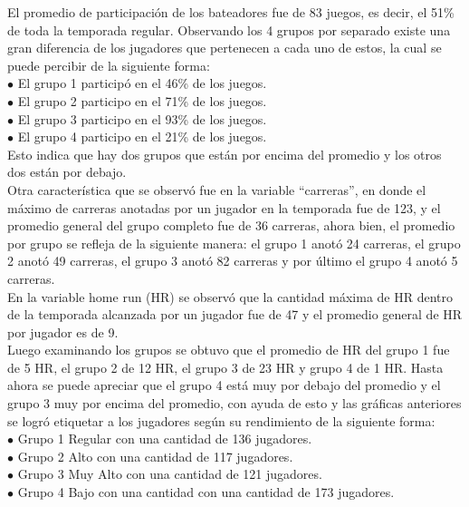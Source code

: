 \documentclass[11pt,letterpaper]{report}
\begin{document}
     
     El promedio de participación de los bateadores fue de 83 juegos, es decir, el 51\% de toda la temporada regular. Observando los 4 grupos por separado existe una gran diferencia de los jugadores que pertenecen a cada uno de estos, la cual se puede percibir de la siguiente forma:\\ 
     
     \noindent $\bullet$ El grupo 1 participó en el 46\% de los juegos.\\ 
     $\bullet$ El grupo 2 participo en el 71\% de los juegos.\\
     $\bullet$ El grupo 3 participo en el 93\% de los juegos.\\
     $\bullet$ El grupo 4 participo en el 21\% de los juegos. \\ 
     
     Esto indica que hay dos grupos que están por encima del promedio y los otros dos están por debajo. \\ 
     
     
     Otra característica que se observó fue en la variable “carreras”, en donde el máximo de carreras anotadas por un jugador en la temporada fue de 123, y el promedio general del grupo completo fue de 36 carreras, ahora bien, el promedio por grupo se refleja de la siguiente manera: el grupo 1 anotó 24 carreras, el grupo 2 anotó 49 carreras, el grupo 3 anotó 82 carreras y por último el grupo 4 anotó 5 carreras. \\
     
     En la variable home run (HR) se observó que la cantidad máxima de HR dentro de la temporada alcanzada por un jugador fue de 47 y el promedio general de HR por jugador es de 9. \\
     
     Luego examinando los grupos se obtuvo que el promedio de HR del grupo 1 fue de 5 HR, el grupo 2 de 12 HR, el grupo 3 de  23 HR y grupo 4 de 1 HR. 
     Hasta ahora se puede apreciar que el grupo 4 está muy por debajo del promedio y el grupo 3 muy por encima del promedio, con ayuda de esto y las gráficas anteriores se logró etiquetar a los jugadores según su rendimiento de la siguiente forma: \\ 
     
     \noindent $\bullet$ Grupo 1 Regular con una cantidad de 136 jugadores.\\ 
     $\bullet$ Grupo 2 Alto con una cantidad de 117 jugadores.\\
     $\bullet$ Grupo 3 Muy Alto con una cantidad de 121 jugadores.\\
     $\bullet$ Grupo 4 Bajo con una cantidad con una cantidad de 173 jugadores.\\ 
     
\end{document}
